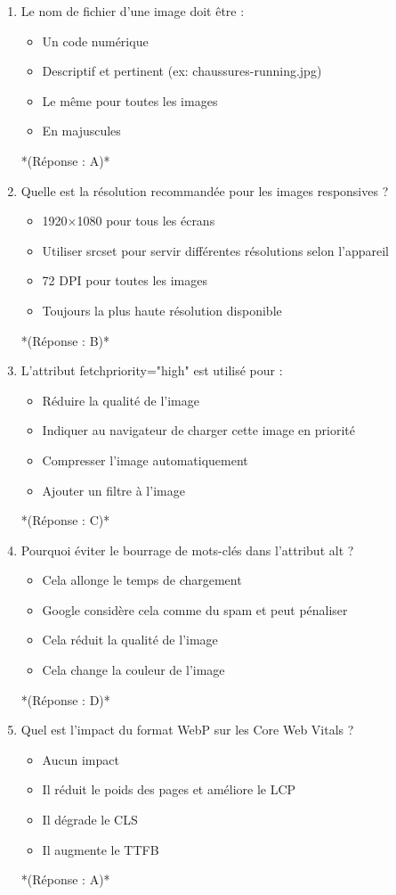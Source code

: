\documentclass[12pt,a4paper,twoside]{report}
\begin{document}
\begin{enumerate}
\item Le nom de fichier d'une image doit être :
\begin{itemize}
\item[A)] Un code numérique
\item[B)] Descriptif et pertinent (ex: chaussures-running.jpg)
\item[C)] Le même pour toutes les images
\item[D)] En majuscules
\end{itemize}
*(Réponse : A)*

\item Quelle est la résolution recommandée pour les images responsives ?
\begin{itemize}
\item[A)] 1920×1080 pour tous les écrans
\item[B)] Utiliser srcset pour servir différentes résolutions selon l'appareil
\item[C)] 72 DPI pour toutes les images
\item[D)] Toujours la plus haute résolution disponible
\end{itemize}
*(Réponse : B)*

\item L'attribut fetchpriority="high" est utilisé pour :
\begin{itemize}
\item[A)] Réduire la qualité de l'image
\item[B)] Indiquer au navigateur de charger cette image en priorité
\item[C)] Compresser l'image automatiquement
\item[D)] Ajouter un filtre à l'image
\end{itemize}
*(Réponse : C)*

\item Pourquoi éviter le bourrage de mots-clés dans l'attribut alt ?
\begin{itemize}
\item[A)] Cela allonge le temps de chargement
\item[B)] Google considère cela comme du spam et peut pénaliser
\item[C)] Cela réduit la qualité de l'image
\item[D)] Cela change la couleur de l'image
\end{itemize}
*(Réponse : D)*

\item Quel est l'impact du format WebP sur les Core Web Vitals ?
\begin{itemize}
\item[A)] Aucun impact
\item[B)] Il réduit le poids des pages et améliore le LCP
\item[C)] Il dégrade le CLS
\item[D)] Il augmente le TTFB
\end{itemize}
*(Réponse : A)*


\end{enumerate}
\end{document}
